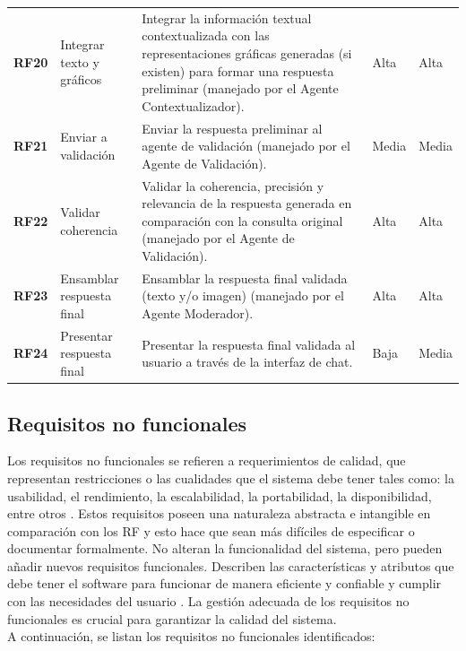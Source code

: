 \begin{longtable}{@{}l >{\raggedright\arraybackslash}p{4cm} >{\raggedright\arraybackslash}p{7cm} l l@{}}
	\textbf{RF20} & Integrar texto y gráficos & Integrar la información textual contextualizada con las representaciones gráficas generadas (si existen) para formar una respuesta preliminar (manejado por el Agente Contextualizador). & Alta & Alta \\ %
	\textbf{RF21} & Enviar a validación & Enviar la respuesta preliminar al agente de validación (manejado por el Agente de Validación). & Media & Media \\ %
	\textbf{RF22} & Validar coherencia & Validar la coherencia, precisión y relevancia de la respuesta generada en comparación con la consulta original (manejado por el Agente de Validación). & Alta & Alta \\ %
	\textbf{RF23} & Ensamblar respuesta final & Ensamblar la respuesta final validada (texto y/o imagen) (manejado por el Agente Moderador). & Alta & Alta \\ %
	\midrule
	
	\textbf{RF24} & Presentar respuesta final & Presentar la respuesta final validada al usuario a través de la interfaz de chat. & Baja & Media \\ %
	
\end{longtable}

\subsection{Requisitos no funcionales}

Los requisitos no funcionales se refieren a requerimientos de calidad, que representan restricciones o las cualidades que el sistema debe tener tales como: la usabilidad, el rendimiento, la escalabilidad, la portabilidad, la disponibilidad, entre otros \cite{sommerville2011software}. Estos requisitos poseen una naturaleza abstracta e intangible en comparación con los RF y esto hace que sean más difíciles de especificar o documentar formalmente. No alteran la funcionalidad del sistema, pero pueden añadir nuevos requisitos funcionales. Describen las características y atributos que debe tener el software para funcionar de manera eficiente y confiable y cumplir con las necesidades del usuario \cite{molina2019requisitos}.
La gestión adecuada de los requisitos no funcionales es crucial para garantizar la calidad del sistema.\\

A continuación, se listan los requisitos no funcionales identificados:


